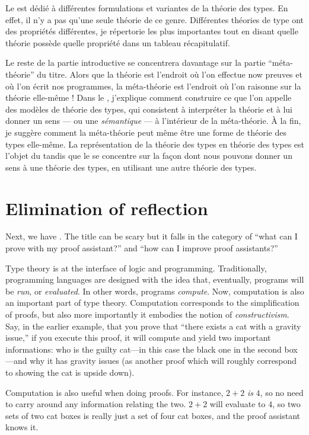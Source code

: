 Le  est dédié à différentes formulations et variantes de la
théorie des types. En effet, il n'y a pas qu'une seule théorie de ce genre.
Différentes théories de type ont des propriétés différentes, je répertorie les
plus importantes tout en disant quelle théorie possède quelle propriété dans un
tableau récapitulatif.

Le reste de la partie introductive se concentrera davantage sur la partie
``méta-théorie'' du titre. Alors que la théorie est l'endroit où l'on effectue now
preuves et où l'on écrit nos programmes, la méta-théorie est l'endroit où l'on raisonne sur la théorie elle-même !
Dans le , j'explique comment construire ce que l'on appelle des
modèles de théorie des types, qui consistent à interpréter la théorie et à lui
donner un sens --- ou une \emph{sémantique} --- à l'intérieur de la
méta-théorie. À la fin, je suggère comment la méta-théorie peut même être une
forme de théorie des types elle-même. La représentation de la théorie des types
en théorie des types est l'objet du  tandis que le
 se concentre sur la façon dont nous pouvons donner un sens à une théorie des types, en utilisant une autre théorie des types.

\section{Elimination of reflection}

Next, we have . The title can be scary but it falls in
the category of ``what can I prove with my proof assistant?'' and
``how can I improve proof assistants?''

Type theory is at the interface of logic and programming. Traditionally,
programming languages are designed with the idea that, eventually, programs
will be \emph{run}, or \emph{evaluated}. In other words, programs
\emph{compute}.
Now, computation is also an important part of type theory. Computation
corresponds to the simplification of proofs, but also more importantly it
embodies the notion of \emph{constructivism}. Say, in the earlier example,
that you prove that ``there exists a cat with a gravity issue,'' if you execute
this proof, it will compute and yield two important informations: who is the
guilty cat---in this case the black one in the second box---and why it has
gravity issues (as another proof which will roughly correspond to showing the
cat is upside down).

Computation is also useful when doing proofs. For instance, \(2 + 2\) \emph{is}
\(4\), so no need to carry around any information relating the two. \(2 + 2\)
will evaluate to \(4\), so two sets of two cat boxes is really just a set of
four cat boxes, and the proof assistant knows it.

